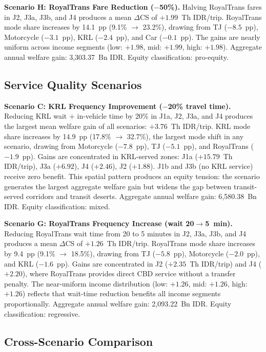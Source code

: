 \documentclass[12pt,a4paper]{article}
\begin{document}
\textbf{Scenario H: RoyalTrans Fare Reduction ($-$50\%).}
Halving RoyalTrans fares in J2, J3a, J3b, and J4 produces a mean $\Delta$CS of $+1.99$~Th IDR/trip. RoyalTrans mode share increases by 14.1~pp (9.1\% $\to$ 23.2\%), drawing from TJ ($-8.5$~pp), Motorcycle ($-3.1$~pp), KRL ($-2.4$~pp), and Car ($-0.1$~pp). The gains are nearly uniform across income segments (low: $+1.98$, mid: $+1.99$, high: $+1.98$). Aggregate annual welfare gain: 3,303.37~Bn IDR. Equity classification: pro-equity.

\subsection{Service Quality Scenarios}

\textbf{Scenario C: KRL Frequency Improvement ($-$20\% travel time).}
Reducing KRL wait $+$ in-vehicle time by 20\% in J1a, J2, J3a, and J4 produces the largest mean welfare gain of all scenarios: $+3.76$~Th IDR/trip. KRL mode share increases by 14.9~pp (17.8\% $\to$ 32.7\%), the largest mode shift in any scenario, drawing from Motorcycle ($-7.8$~pp), TJ ($-5.1$~pp), and RoyalTrans ($-1.9$~pp). Gains are concentrated in KRL-served zones: J1a ($+15.79$~Th IDR/trip), J3a ($+6.92$), J4 ($+2.46$), J2 ($+1.88$). J1b and J3b (no KRL service) receive zero benefit. This spatial pattern produces an equity tension: the scenario generates the largest aggregate welfare gain but widens the gap between transit-served corridors and transit deserts. Aggregate annual welfare gain: 6,580.38~Bn IDR. Equity classification: mixed.

\textbf{Scenario G: RoyalTrans Frequency Increase (wait 20$\to$5~min).}
Reducing RoyalTrans wait time from 20 to 5 minutes in J2, J3a, J3b, and J4 produces a mean $\Delta$CS of $+1.26$~Th IDR/trip. RoyalTrans mode share increases by 9.4~pp (9.1\% $\to$ 18.5\%), drawing from TJ ($-5.8$~pp), Motorcycle ($-2.0$~pp), and KRL ($-1.6$~pp). Gains are concentrated in J2 ($+2.35$~Th IDR/trip) and J4 ($+2.20$), where RoyalTrans provides direct CBD service without a transfer penalty. The near-uniform income distribution (low: $+1.26$, mid: $+1.26$, high: $+1.26$) reflects that wait-time reduction benefits all income segments proportionally. Aggregate annual welfare gain: 2,093.22~Bn IDR. Equity classification: regressive.

\subsection{Cross-Scenario Comparison}
\end{document}

